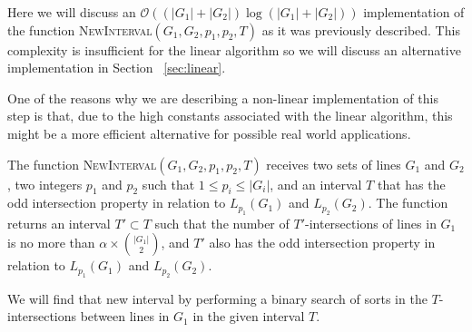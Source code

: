 \documentclass{article}
\def\bigo{\mathcal{O}}
\begin{document}
 \newcommand{\Eval}{\textsc{Eval}}
\newcommand{\SortEval}{\textsc{SortEval}}
\newcommand{\rand}{\textsc{rand}}
\newcommand{\InversionsAndRandomInversion}{\textsc{InversionsAndRandomInversion}}
\newcommand{\IntersectionsAndRandomIntersection}{\textsc{IntersectionsAndRandomIntersection}}
\newcommand{\first}{\mathit{first}}
\newcommand{\second}{\mathit{second}}
\newcommand{\None}{\mathrm{none}}
\newcommand{\answer}{\mathit{answer}}
\newcommand{\resp}{\mathit{resp}}
\newcommand{\Sort}{\mathit{Sort}}
\newcommand{\To}{\textbf{to}}
\newcommand{\Left}{\mathit{left}}
\newcommand{\Right}{\mathit{right}}
\newcommand{\Aux}{\mathit{Aux}}
\newcommand{\ans}{\mathit{ans}}
\newcommand{\intersection}{\mathit{intersection}}
\newcommand{\inversions}{\mathit{inversions}}
\newcommand{\randinver}{\mathit{random\_inversion}}
\newcommand{\inter}{\mathit{inter}}
\newcommand{\aux}{\mathit{aux}}
\newcommand{\currinters}{\mathit{current\_intersections}}
\newcommand{\randinter}{\mathit{random\_intersection}}
\newcommand{\pivot}{\mathit{pivot}}

Here we will discuss an $\bigo ((|G_1|+|G_2|) \log (|G_1|+|G_2|))$ implementation of the function \textsc{NewInterval}$(G_1,G_2,p_1,p_2,T)$ as it was previously described. This complexity is insufficient for the linear algorithm so we will discuss an alternative implementation in Section~ \ref{sec:linear}.

One of the reasons why we are describing a non-linear implementation of this step is that, due to the high constants associated with the linear algorithm, this might be a more efficient alternative for possible real world applications.

The function \textsc{NewInterval}$(G_1,G_2,p_1,p_2,T)$ receives two sets of lines $G_1$ and $G_2$, two integers $p_1$ and $p_2$ such that $1 \leq p_i \leq |G_i|$, and an interval $T$ that has the odd intersection property in relation to $L_{p_1}(G_1)$ and $L_{p_2}(G_2)$. The function returns an interval $T'\subset T$ such that the number of $T'$-intersections of lines in $G_1$ is no more than $\alpha \times {|G_1| \choose 2}$, and $T'$ also has the odd intersection property in relation to $L_{p_1}(G_1)$ and $L_{p_2}(G_2)$.


We will find that new interval by performing a binary search of sorts in the $T$-intersections between lines in $G_1$ in the given interval $T$.
\end{document}
